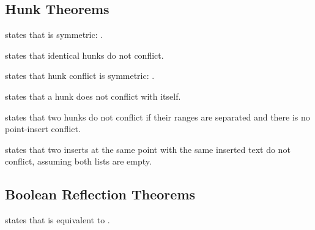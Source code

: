 \subsection{Hunk Theorems}

\begin{theorem}
 states that  is symmetric:
.
\end{theorem}

\begin{theorem}
 states that identical hunks do
not conflict.
\end{theorem}

\begin{theorem}
 states that hunk conflict is symmetric:
.
\end{theorem}

\begin{theorem}
 states that a hunk does not conflict with
itself.
\end{theorem}

\begin{theorem}
 states that two hunks do not conflict if
their ranges are separated and there is no point-insert conflict.
\end{theorem}

\begin{theorem}
 states that two inserts at the
same point with the same inserted text do not conflict, assuming both
 lists are empty.
\end{theorem}

\subsection{Boolean Reflection Theorems}

\begin{theorem}
 states that
 is equivalent to
.
\end{theorem}

